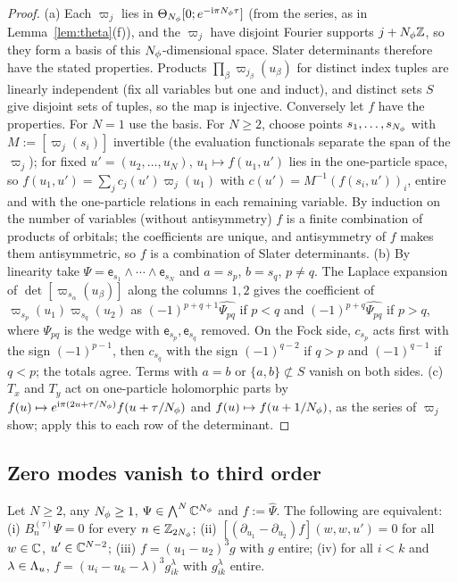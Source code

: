 \begin{proof}
(a) Each $\varpi_j$ lies in $\Theta_{N_{\phi}}[0;e^{-\mathrm{i}\pi N_{\phi}\tau}]$ (from the series, as in Lemma~\ref{lem:theta}(f)), and the
$\varpi_j$ have disjoint Fourier supports $j+N_{\phi}\mathbb{Z}$, so they form a basis of this $N_{\phi}$-dimensional space. Slater
determinants therefore have the stated properties. Products $\prod_\beta\varpi_{j_\beta}(u_\beta)$ for distinct index tuples are
linearly independent (fix all variables but one and induct), and distinct sets $S$ give disjoint sets of tuples, so the
map is injective. Conversely let $f$ have the properties. For $N=1$ use the basis. For $N\ge2$, choose points
$s_1,\dots,s_{N_{\phi}}$ with $M:=[\varpi_j(s_i)]$ invertible (the evaluation functionals separate the span of the $\varpi_j$);
for fixed $u'=(u_2,\dots,u_N)$, $u_1\mapsto f(u_1,u')$ lies in the one-particle space, so $f(u_1,u')=\sum_jc_j(u')\varpi_j(u_1)$
with $c(u')=M^{-1}(f(s_i,u'))_i$, entire and with the one-particle relations in each remaining variable. By induction on the
number of variables (without antisymmetry) $f$ is a finite combination of products of orbitals; the coefficients are unique,
and antisymmetry of $f$ makes them antisymmetric, so $f$ is a combination of Slater determinants.
(b) By linearity take $\Psi=\mathsf e_{s_1}\wedge\cdots\wedge\mathsf e_{s_N}$ and $a=s_p$, $b=s_q$, $p\neq q$. The Laplace expansion of
$\det[\varpi_{s_\alpha}(u_\beta)]$ along the columns $1,2$ gives the coefficient of $\varpi_{s_p}(u_1)\varpi_{s_q}(u_2)$ as
$(-1)^{p+q+1}\widehat{\Psi_{pq}}$ if $p<q$ and $(-1)^{p+q}\widehat{\Psi_{pq}}$ if $p>q$, where $\Psi_{pq}$ is the wedge with
$\mathsf e_{s_p},\mathsf e_{s_q}$ removed. On the Fock side, $c_{s_p}$ acts first with the sign $(-1)^{p-1}$, then $c_{s_q}$ with the sign
$(-1)^{q-2}$ if $q>p$ and $(-1)^{q-1}$ if $q<p$; the totals agree. Terms with $a=b$ or $\{a,b\}\not\subset S$ vanish on both sides.
(c) $T_x$ and $T_y$ act on one-particle holomorphic parts by $f(u)\mapsto e^{\mathrm{i}\pi(2u+\tau/N_{\phi})}f(u+\tau/N_{\phi})$ and
$f(u)\mapsto f(u+1/N_{\phi})$, as the series of $\varpi_j$ show; apply this to each row of the determinant.
\end{proof}

\subsection{Zero modes vanish to third order}

\begin{lemma}\label{lem:formulation}
Let $N\ge2$, any $N_{\phi}\ge1$, $\Psi\in\bigwedge^N\mathbb{C}^{N_{\phi}}$ and $f:=\widehat\Psi$. The following are equivalent:
(i) $B^{(\tau)}_n\Psi=0$ for every $n\in\mathbb{Z}_{2N_{\phi}}$;
(ii) $[(\partial_{u_1}-\partial_{u_2})f](w,w,u')=0$ for all $w\in\mathbb{C}$, $u'\in\mathbb{C}^{N-2}$;
(iii) $f=(u_1-u_2)^3g$ with $g$ entire;
(iv) for all $i<k$ and $\lambda\in\Lambda_u$, $f=(u_i-u_k-\lambda)^3g_{ik}^\lambda$ with $g_{ik}^\lambda$ entire.
\end{lemma}

